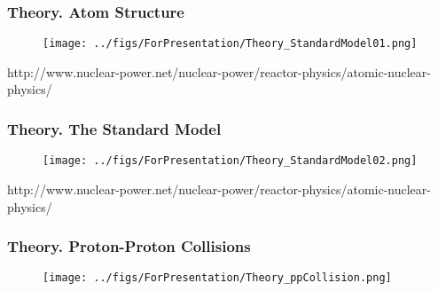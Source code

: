 \begin{frame}\frametitle{Theory. Atom Structure}
\begin{figure}[htb]
  \begin{center}
    \texttt{[image: ../figs/ForPresentation/Theory\_StandardModel01.png]}
  \end{center}
\end{figure}
\tiny
http://www.nuclear-power.net/nuclear-power/reactor-physics/atomic-nuclear-physics/
\end{frame}%

\begin{frame}\frametitle{Theory. The Standard Model}
\begin{figure}[htb]
  \begin{center}
    \texttt{[image: ../figs/ForPresentation/Theory\_StandardModel02.png]}
  \end{center}
\end{figure}
\tiny
http://www.nuclear-power.net/nuclear-power/reactor-physics/atomic-nuclear-physics/
\end{frame}%

\begin{frame}\frametitle{Theory. Proton-Proton Collisions}
\begin{figure}[htb]
  \begin{center}
    \texttt{[image: ../figs/ForPresentation/Theory\_ppCollision.png]}
  \end{center}
\end{figure}
\end{frame}%

